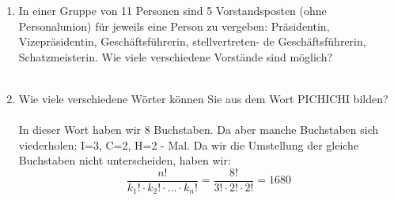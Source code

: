\begin{enumerate}[label=(\alph*)]
        \item In einer Gruppe von 11 Personen sind 5 Vorstandsposten (ohne Personalunion) für jeweils
        eine Person zu vergeben: Präsidentin, Vizepräsidentin, Geschäftsführerin, stellvertreten-
        de Geschäftsführerin, Schatzmeisterin. Wie viele verschiedene Vorstände sind möglich?\\\\

        \item Wie viele verschiedene Wörter können Sie aus dem Wort PICHICHI bilden?\\\\
        In dieser Wort haben wir 8 Buchstaben. Da aber manche Buchstaben sich viederholen: 
        I=3, C=2, H=2 - Mal. Da wir die Umstellung der gleiche Buchstaben nicht unterscheiden, haben wir:
        \[\frac{n!}{k_1!\cdot k_2!\cdot\ldots\cdot k_n!} = \frac{8!}{3!\cdot2!\cdot2!} = 1680\]
		
	\end{enumerate}
